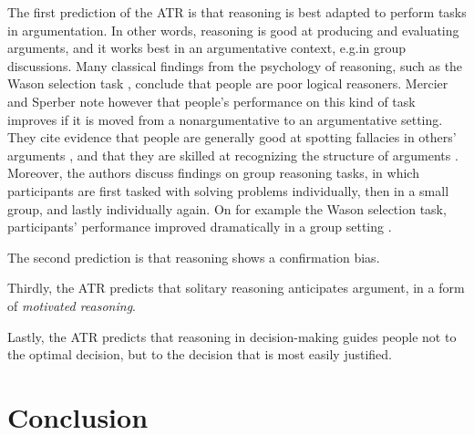 The first prediction of the ATR is that reasoning is best adapted to perform tasks in argumentation. In other words, reasoning is good at producing and evaluating arguments, and it works best in an argumentative context, e.g.\@ in group discussions.
Many classical findings from the psychology of reasoning, such as the Wason selection task \citep{Wason68}, conclude that people are poor logical reasoners. Mercier and Sperber note however that people's performance on this kind of task improves if it is moved from a nonargumentative to an argumentative setting. They cite evidence that people are generally good at spotting fallacies in others' arguments , and that they are skilled at recognizing the structure of arguments .
Moreover, the authors discuss findings on group reasoning tasks, in which participants are first tasked with solving problems individually, then in a small group, and lastly individually again. On for example the Wason selection task, participants' performance improved dramatically in a group setting \citep{Moshman98} .

The second prediction is that reasoning shows a confirmation bias.

Thirdly, the ATR predicts that solitary reasoning anticipates argument, in a form of \emph{motivated reasoning}.

Lastly, the ATR predicts that reasoning in decision-making guides people not to the optimal decision, but to the decision that is most easily justified.

\section{Conclusion}
